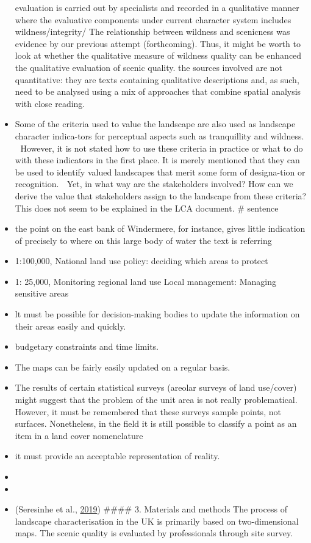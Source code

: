 \documentclass[]{elsarticle} %
\begin{document}
\begin{itemize}
  evaluation is carried out by specialists and recorded in a qualitative
  manner where the evaluative components under current character system
  includes wildness/integrity/ The relationship between wildness and
  scenicness was evidence by our previous attempt (forthcoming). Thus,
  it might be worth to look at whether the qualitative measure of
  wildness quality can be enhanced the qualitative evaluation of scenic
  quality. the sources involved are not quantitative: they are texts
  containing qualitative descriptions and, as such, need to be analysed
  using a mix of approaches that combine spatial analysis with close
  reading.
\item
  Some of the criteria used to value the landscape are also used as
  landscape character indica-tors for perceptual aspects such as
  tranquillity and wildness.  However, it is not stated how to use
  these criteria in practice or what to do with these indicators in the
  first place. It is merely mentioned that they can be used to identify
  valued landscapes that merit some form of designa-tion or recognition.
   Yet, in what way are the stakeholders involved? How can we derive
  the value that stakeholders assign to the landscape from these
  criteria? This does not seem to be explained in the LCA document. \#
  sentence
\item
  the point on the east bank of Windermere, for instance, gives little
  indication of precisely to where on this large body of water the text
  is referring
\item
  1:100,000, National land use policy: deciding which areas to protect
\item
  1: 25,000, Monitoring regional land use Local management: Managing
  sensitive areas
\item
  lt must be possible for decision-making bodies to update the
  information on their areas easily and quickly.
\item
  budgetary constraints and time limits.
\item
  The maps can be fairly easily updated on a regular basis.
\item
  The results of certain statistical surveys (areolar surveys of land
  use/cover) might suggest that the problem of the unit area is not
  really problematical. However, it must be remembered that these
  surveys sample points, not surfaces. Nonetheless, in the field it is
  still possible to classify a point as an item in a land cover
  nomenclature
\item
  it must provide an acceptable representation of reality.
\item
\item
\item
  (Seresinhe et al., \protect\hyperlink{ref-Seresinhe2019}{2019})
  \#\#\#\# 3. Materials and methods The process of landscape
  characterisation in the UK is primarily based on two-dimensional maps.
  The scenic quality is evaluated by professionals through site survey.
\end{itemize}
\end{document}
